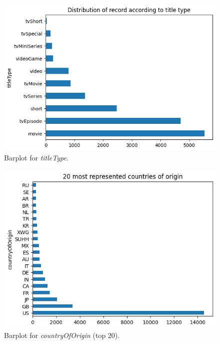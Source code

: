 \begin{figure}
    \includegraphics[width=\columnwidth]{../../results/images/barplot_titleType.png}
    \caption{Barplot for \textit{titleType}.}
    \label{fig:barplot_titleType.png}
\end{figure}

\begin{figure}
    \includegraphics[width=\columnwidth]{../../results/images/barplot_countryOfOrigin.png}
    \caption{Barplot for \textit{countryOfOrigin} (top 20).}
    \label{fig:barplot_countryOfOrigin.png}
\end{figure}

